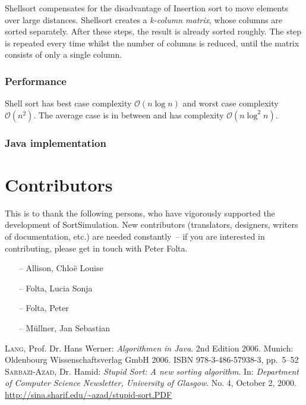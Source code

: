 \documentclass[]{pfBook}
\newcommand{\OO}{\mathcal{O}}
\begin{document}
	Shellsort compensates for the disadvantage of Insertion sort to move elements over large distances. Shellsort creates a \emph{k-column matrix}, whose columns are sorted separately. After these steps, the result is already sorted roughly. The step is repeated every time whilst the number of columns is reduced, until the matrix consists of only a single column.
	
	\subsubsection{Performance}
	
	Shell sort has best case complexity $\OO(n \log n)$ and worst case complexity $\OO(n^2)$. The average case is in between and has complexity $\OO(n \log^2 n)$.
	
	\subsubsection{Java implementation}
	
	
	
	\section{Contributors}
	
	This is to thank the following persons, who have vigorously supported the development of SortSimulation. New contributors (translators, designers, writers of documentation, etc.) are needed constantly~-- if you are interested in contributing, please get in touch with Peter Folta.

	\begin{itemize}
		\item[--] Allison, Chlo\"{e} Louise
		\item[--] Folta, Lucia Sonja
		\item[--] Folta, Peter
		\item[--] M\"{u}llner, Jan Sebastian
	\end{itemize}
	
	\begin{thebibliography}{99}
			\textsc{Lang}, Prof. Dr. Hans Werner: \emph{Algorithmen in Java}. 2nd Edition 2006. Munich: Oldenbourg Wissenschaftsverlag GmbH 2006. ISBN 978-3-486-57938-3, pp.~5--52
			\textsc{Sarbazi-Azad}, Dr. Hamid: \emph{Stupid Sort: A new sorting algorithm}. In: \emph{Department of Computer Science Newsletter, University of Glasgow}. No. 4, October 2, 2000. \href{http://sina.sharif.edu/~azad/stupid-sort.PDF}{http://sina.sharif.edu/\~{}azad/stupid-sort.PDF}
	\end{thebibliography}
	
	\makelistoffigures
	\makelistoflistings
\end{document}
